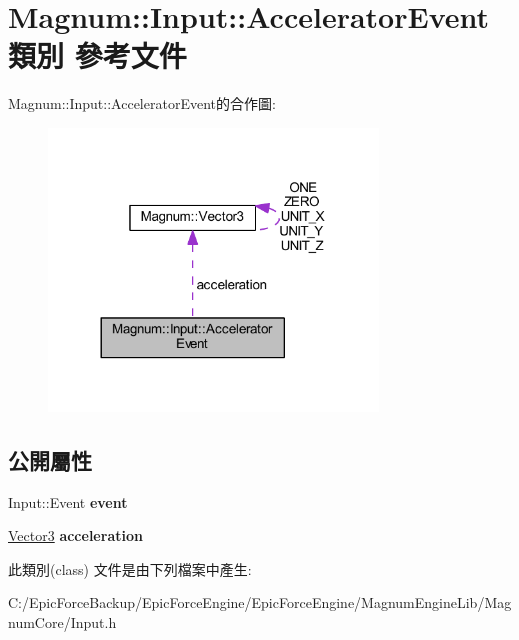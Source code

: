 \hypertarget{class_magnum_1_1_input_1_1_accelerator_event}{}\section{Magnum\+:\+:Input\+:\+:Accelerator\+Event 類別 參考文件}
\label{class_magnum_1_1_input_1_1_accelerator_event}


Magnum\+:\+:Input\+:\+:Accelerator\+Event的合作圖\+:\nopagebreak
\begin{figure}[H]
\begin{center}
\leavevmode
\includegraphics[width=248pt]{class_magnum_1_1_input_1_1_accelerator_event__coll__graph}
\end{center}
\end{figure}
\subsection*{公開屬性}
\begin{DoxyCompactItemize}
\item 
Input\+::\+Event {\bfseries event}\hypertarget{class_magnum_1_1_input_1_1_accelerator_event_af0e9e7683e6b138bb5ecfa0f5b7bc3f1}{}\label{class_magnum_1_1_input_1_1_accelerator_event_af0e9e7683e6b138bb5ecfa0f5b7bc3f1}

\item 
\hyperlink{class_magnum_1_1_vector3}{Vector3} {\bfseries acceleration}\hypertarget{class_magnum_1_1_input_1_1_accelerator_event_a58d0440d2df80ae6d01d37735f409d4f}{}\label{class_magnum_1_1_input_1_1_accelerator_event_a58d0440d2df80ae6d01d37735f409d4f}

\end{DoxyCompactItemize}


此類別(class) 文件是由下列檔案中產生\+:\begin{DoxyCompactItemize}
\item 
C\+:/\+Epic\+Force\+Backup/\+Epic\+Force\+Engine/\+Epic\+Force\+Engine/\+Magnum\+Engine\+Lib/\+Magnum\+Core/Input.\+h\end{DoxyCompactItemize}
